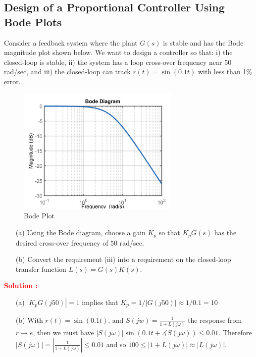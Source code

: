 \documentclass[12pt]{article}
\begin{document}
\subsection{Design of a Proportional Controller Using Bode Plots}

Consider a feedback system where the plant $G(s)$ is stable and has the Bode magnitude plot shown below. We want to design a controller so that: i) the closed-loop is stable, ii) the system has a loop cross-over frequency near 50 rad/sec, and iii) the closed-loop can track $r(t) = \sin(0.1t)$ with less than 1\% error.
\begin{figure}[h]
    \centering
    \includegraphics[width=0.7\textwidth]{figs/6.8.png}
    \caption{Bode Plot}
    \label{fig:bode_94}
\end{figure}

\begin{itemize}
    \item[(a)] Using the Bode diagram, choose a gain $K_p$ so that $K_p G(s)$ has the desired cross-over frequency of $50$ rad/sec.
    \item[(b)] Convert the requirement (iii) into a requirement on the closed-loop transfer function $L(s) = G(s) K(s)$.
\end{itemize}

\textbf{\textcolor{red}{Solution :}}

\begin{itemize}
    \item[(a)] $|K_p G(j 50)| = 1$ implies that $K_p = 1/ |G(j 50)| \approx 1/ 0.1 = 10$
    \item[(b)] With $r(t)=\sin(0.1 t)$, and $S(j w) = \frac{1}{1+L(j \omega)}$ the response from $r \rightarrow e$, then we must have $|S(j \omega) |\sin(0.1 t + \measuredangle S(j \omega)) \leq 0.01$. Therefore $|S(j \omega)| = |\frac{1}{1 + L(j \omega)}| \leq 0.01$ and so $100\leq |1+L(j\omega)| \approx | L(j\omega)|$. 
\end{itemize}
\clearpage
\end{document}
